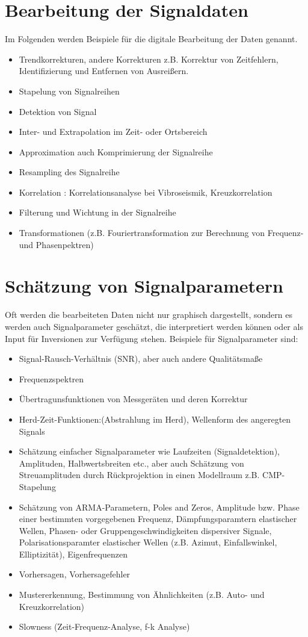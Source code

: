 \section{Bearbeitung der Signaldaten}
Im Folgenden werden Beispiele für die digitale Bearbeitung der Daten genannt.
\begin{itemize}
\item Trendkorrekturen, andere Korrekturen z.B. Korrektur von Zeitfehlern, Identifizierung und Entfernen von Ausreißern. 
\item Stapelung von Signalreihen
\item Detektion von Signal
\item Inter- und Extrapolation im Zeit- oder Ortsbereich
\item Approximation auch Komprimierung der Signalreihe
\item Resampling des Signalreihe
\item Korrelation : Korrelationsanalyse bei Vibroseismik, Kreuzkorrelation
\item Filterung und Wichtung in der Signalreihe
\item Transformationen (z.B. Fouriertransformation zur Berechnung von Frequenz- und Phasenpektren)
\end{itemize}

\section{Schätzung von Signalparametern}
Oft werden die bearbeiteten Daten nicht nur graphisch dargestellt, sondern es werden auch Signalparameter geschätzt, die interpretiert werden können oder als Input für Inversionen zur Verfügung stehen. Beispiele für Signalparameter sind:
\begin{itemize}
\item Signal-Rausch-Verhältnis (SNR), aber auch andere Qualitätsmaße
\item Frequenzspektren
\item Übertragunsfunktionen von Messgeräten und deren Korrektur
\item Herd-Zeit-Funktionen:(Abstrahlung im Herd), Wellenform des angeregten Signals
\item Schätzung einfacher Signalparameter wie Laufzeiten (Signaldetektion), Amplituden, Halbwertsbreiten etc., aber auch Schätzung von Streuamplituden durch Rückprojektion in einen Modellraum z.B. CMP-Stapelung
\item Schätzung von ARMA-Parametern, Poles and Zeros, Amplitude bzw. Phase einer bestimmten vorgegebenen Frequenz, Dämpfungsparamtern elastischer Wellen, Phasen- oder Gruppengeschwindigkeiten dispersiver Signale, Polarisationsparamter elastischer Wellen (z.B. Azimut, Einfallswinkel, Elliptizität), Eigenfrequenzen
\item Vorhersagen, Vorhersagefehler
\item Mustererkennung, Bestimmung von Ähnlichkeiten (z.B. Auto- und Kreuzkorrelation)
\item Slowness (Zeit-Frequenz-Analyse, f-k Analyse)
  \end{itemize}


